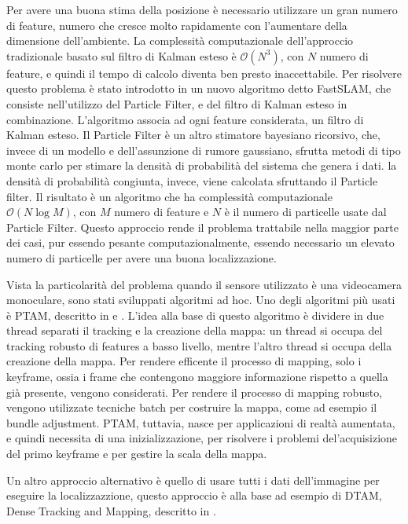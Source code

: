 Per avere una buona stima della posizione è necessario utilizzare un gran numero di feature, numero che cresce molto rapidamente con l'aumentare della dimensione dell'ambiente.
La complessità computazionale dell'approccio tradizionale basato sul filtro di Kalman esteso è $\mathcal{O}(N^3)$, con $N$ numero di feature, e quindi il tempo di calcolo diventa ben presto inaccettabile.
Per risolvere questo problema è stato introdotto in \cite{Montemerlo02a}  un nuovo algoritmo detto FastSLAM, che consiste nell'utilizzo del Particle Filter, e del filtro di Kalman esteso in combinazione. L'algoritmo associa ad ogni feature considerata, un filtro di Kalman esteso.
Il Particle Filter è un altro stimatore bayesiano ricorsivo, che, invece di un modello e dell'assunzione di rumore gaussiano, sfrutta metodi di tipo monte carlo per stimare la densità di probabilità del sistema che genera i dati.
la densità di probabilità congiunta, invece, viene calcolata sfruttando il Particle filter. 
Il risultato è un algoritmo che ha complessità computazionale $\mathcal{O}(N\log M)$, con $M$ numero di feature e $N$ è il numero di particelle usate dal Particle Filter. 
Questo approccio rende il problema trattabile nella maggior parte dei casi, pur essendo pesante computazionalmente, essendo necessario un elevato numero di particelle per avere una buona localizzazione.

Vista la particolarità del problema quando il sensore utilizzato è una videocamera monoculare, sono stati sviluppati algoritmi ad hoc.
Uno degli algoritmi più usati è PTAM, descritto in \cite{klein07parallel} e \cite{klein08improving}.
L'idea alla base di questo algoritmo è dividere in due thread separati il tracking e la creazione della mappa: un thread si occupa del tracking robusto di features a basso livello, mentre l'altro thread si occupa della creazione della mappa. 
Per rendere efficente il processo di mapping, solo i keyframe, ossia i frame che contengono maggiore informazione rispetto a quella già presente, vengono considerati.
Per rendere il processo di mapping robusto, vengono utilizzate tecniche batch per costruire la mappa, come ad esempio il bundle adjustment.
PTAM, tuttavia, nasce per applicazioni di realtà aumentata, e quindi necessita di una inizializzazione, per risolvere i problemi del'acquisizione del primo keyframe e per gestire la scala della mappa.

Un altro approccio alternativo è quello di usare tutti i dati dell'immagine per eseguire la localizzazzione, questo approccio è alla base ad esempio di DTAM, Dense Tracking and Mapping, descritto in \cite{conf/iccv/NewcombeLD11}.

